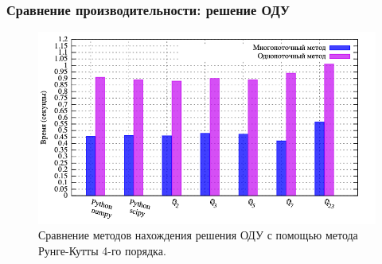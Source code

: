 \documentclass[10pt,professionalfont,utf8,presentation,compress]{beamer}
\theoremstyle{definition}
\newtheorem{defn}{Определение}
\theoremstyle{plain}
\begin{document}
\begin{frame}
\frametitle{Сравнение производительности: решение ОДУ}
\begin{figure}[H]
\centerline{\includegraphics[width=0.95\linewidth]{../gnuplot/multi/rk/plot.png}}
\caption{Сравнение методов нахождения решения ОДУ с помощью метода Рунге-Кутты 4-го порядка.}
\label{img:comp:ode:rk}
\end{figure}
\end{frame}







\end{document}
